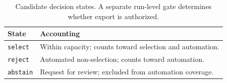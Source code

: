 \begin{table}[t]
\centering\small
\caption{Candidate decision states. A separate run-level gate determines whether export is authorized.}
\label{tab:decision_states}
\begin{tabularx}{\columnwidth}{lX}
\toprule
State & Accounting \\
\midrule
\texttt{select} & Within capacity; counts toward selection and automation. \\
\texttt{reject} & Automated non-selection; counts toward automation. \\
\texttt{abstain} & Request for review; excluded from automation coverage. \\
\bottomrule
\end{tabularx}
\end{table}
